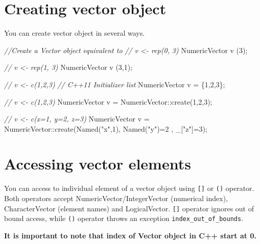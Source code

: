 \documentclass[]{book}
\newenvironment{Shaded}{\begin{snugshade}}{\end{snugshade}}
\newcommand{\DecValTok}[1]{\textcolor[rgb]{0.00,0.00,0.81}{#1}}
\newcommand{\StringTok}[1]{\textcolor[rgb]{0.31,0.60,0.02}{#1}}
\newcommand{\CommentTok}[1]{\textcolor[rgb]{0.56,0.35,0.01}{\textit{#1}}}
\newcommand{\NormalTok}[1]{#1}
\theoremstyle{definition}
\theoremstyle{definition}
\theoremstyle{remark}
\begin{document}
\section{Creating vector object}\label{creating-vector-object}

You can create vector object in several ways.

\begin{Shaded}
\begin{Highlighting}[]
\CommentTok{//Create a Vector object equivalent to}
\CommentTok{// v <- rep(0, 3)}
\NormalTok{NumericVector v (}\DecValTok{3}\NormalTok{);}

\CommentTok{// v <- rep(1, 3)}
\NormalTok{NumericVector v (}\DecValTok{3}\NormalTok{,}\DecValTok{1}\NormalTok{);}

\CommentTok{// v <- c(1,2,3) }
\CommentTok{// C++11 Initializer list}
\NormalTok{NumericVector v = \{}\DecValTok{1}\NormalTok{,}\DecValTok{2}\NormalTok{,}\DecValTok{3}\NormalTok{\}; }

\CommentTok{// v <- c(1,2,3)}
\NormalTok{NumericVector v = NumericVector::create(}\DecValTok{1}\NormalTok{,}\DecValTok{2}\NormalTok{,}\DecValTok{3}\NormalTok{);}

\CommentTok{// v <- c(x=1, y=2, z=3)}
\NormalTok{NumericVector v =}
\NormalTok{  NumericVector::create(Named(}\StringTok{"x"}\NormalTok{,}\DecValTok{1}\NormalTok{), Named(}\StringTok{"y"}\NormalTok{)=}\DecValTok{2}\NormalTok{ , _[}\StringTok{"z"}\NormalTok{]=}\DecValTok{3}\NormalTok{);}
\end{Highlighting}
\end{Shaded}

\section{Accessing vector elements}\label{accessing-vector-elements}

You can access to individual element of a vector object using
\texttt{{[}{]}} or \texttt{()} operator. Both operators accept
NumericVector/IntegerVector (numerical index), CharacterVector (element
names) and LogicalVector. \texttt{{[}{]}} operator ignores out of bound
access, while \texttt{()} operator throws an exception
\texttt{index\_out\_of\_bounds}.

\textbf{It is important to note that index of Vector object in C++ start
at 0.}
\end{document}
